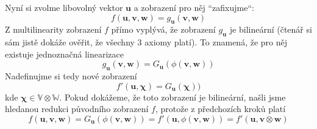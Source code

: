 \documentclass[a5paper,12pt]{amsbook}
\theoremstyle{definition}
\newcommand{\myvec}[1]{\bm{#1}}
\newcommand{\myspace}[1]{\mathbb{#1}}
\begin{document}
Nyní si zvolme libovolný vektor $\myvec{u}$ a zobrazení pro něj ``zafixujme``:
\begin{equation*}
f(\myvec{u}, \myvec{v}, \myvec{w}) = g_{\myvec{u}}(\myvec{v}, \myvec{w})
\end{equation*}
Z multilinearity zobrazení $f$ přímo vyplývá, že zobrazení $g_{\myvec{u}}$ je bilineární (čtenář
si sám jistě dokáže ověřit, že všechny 3 axiomy platí). To znamená, že pro něj existuje jednoznačná
linearizace
\begin{equation*}
g_{\myvec{u}}(\myvec{v}, \myvec{w}) = G_{\myvec{u}}(\phi(\myvec{v}, \myvec{w}))
\end{equation*}
Nadefinujme si tedy nové zobrazení
\begin{equation*}
f'(\myvec{u}, \myvec{\chi}) = G_{\myvec{u}}(\myvec{\chi}))
\end{equation*}
kde $\myvec{\chi}\in\myspace{V}\otimes\myspace{W}$. Pokud dokážeme, že toto zobrazení je bilineární,
našli jsme hledanou redukci původního zobrazení $f$, protože z předchozích kroků platí
\begin{equation*}
f(\myvec{u}, \myvec{v}, \myvec{w}) = G_{\myvec{u}}(\phi(\myvec{v}, \myvec{w})) 
  = f'(\myvec{u}, \phi(\myvec{v}, \myvec{w})) = f'(\myvec{u}, \myvec{v}\otimes\myvec{w})
\end{equation*}
\end{document}
